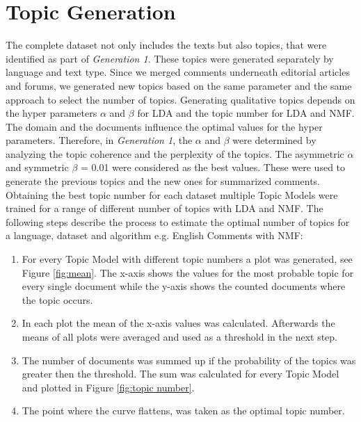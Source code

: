 \section{Topic Generation}
The complete dataset not only includes the texts but also topics, that were identified as part of \textit{Generation 1}. These topics were generated separately by language and text type. Since we merged comments underneath editorial articles and forums, we generated new topics based on the same parameter and the same approach to select the number of topics.
Generating qualitative topics depends on the hyper parameters $\alpha$ and $\beta$ for \ac{LDA} and the topic number for \ac{LDA} and \ac{NMF}. The domain and the documents influence the optimal values for the hyper parameters. Therefore, in \textit{Generation 1}, the $\alpha$ and  $\beta$ were determined by analyzing the topic coherence and the perplexity of the topics. The asymmetric $\alpha$ and symmetric $\beta$ = 0.01 were considered as the best values. These were used to generate the previous topics and the new ones for summarized comments.
Obtaining the best topic number for each dataset multiple Topic Models were trained for a range of different number of topics with \ac{LDA} and \ac{NMF}. The following steps describe the process to estimate the optimal number of topics for a language, dataset and algorithm e.g. English Comments with \ac{NMF}:
\begin{enumerate}
	\item For every Topic Model with different topic numbers a plot was generated, see Figure \ref{fig:mean}.
	The x-axis shows the values for the most probable topic for every single  document while the y-axis shows the counted documents where the topic occurs.
	\item In each plot the mean of the x-axis values was calculated. Afterwards the means of all plots were averaged and used as a threshold in the next step.
	\item The number of documents was summed up if the probability of the topics was greater then the threshold. The sum was calculated for every Topic Model and plotted in Figure \ref{fig:topic number}.
	\item The point where the curve flattens, was taken as the optimal topic number.
\end{enumerate}


